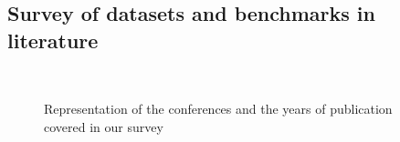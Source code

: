 \subsection{Survey of datasets and benchmarks in literature}
\begin{figure}
    \centering
     \hfill
    \\
    \caption{Representation of the conferences and the years of publication covered in our survey}
    \label{fig:tag-clouds}
\end{figure}

